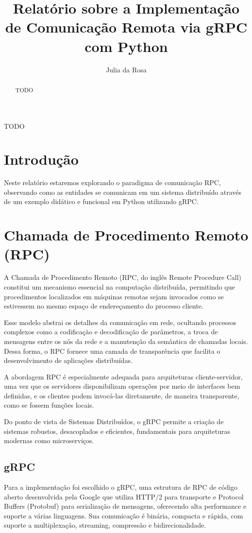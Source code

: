 \documentclass[12pt]{article}
\title{Relatório sobre a Implementação de Comunicação Remota via gRPC com Python}
\author{Julia da Rosa\inst{1}}
\begin{document}
 

\maketitle

\begin{abstract}
  TODO
\end{abstract}
     
\begin{resumo} 
  TODO
\end{resumo}

\section{Introdução}

Neste relatório estaremos explorando o paradigma de comunicação RPC, observando como as entidades se comunicam em um sistema distribuído através de um exemplo didático e funcional em Python utilizando gRPC.

\section{Chamada de Procedimento Remoto (RPC)}

A Chamada de Procedimento Remoto (RPC, do inglês Remote Procedure Call) constitui um mecanismo essencial na computação distribuída, permitindo que procedimentos localizados em máquinas remotas sejam invocados como se estivessem no mesmo espaço de endereçamento do processo cliente.

Esse modelo abstrai os detalhes da comunicação em rede, ocultando processos complexos como a codificação e decodificação de parâmetros, a troca de mensagens entre os nós da rede e a manutenção da semântica de chamadas locais. Dessa forma, o RPC fornece uma camada de transparência que facilita o desenvolvimento de aplicações distribuídas.

A abordagem RPC é especialmente adequada para arquiteturas cliente-servidor, uma vez que os servidores disponibilizam operações por meio de interfaces bem definidas, e os clientes podem invocá-las diretamente, de maneira transparente, como se fossem funções locais.

Do ponto de vista de Sistemas Distribuídos, o gRPC permite a criação de sistemas robustos, desacoplados e eficientes, fundamentais para arquiteturas modernas como microserviços.


\subsection{gRPC}
Para a implementação foi escolhido o gRPC, uma estrutura de RPC de código aberto desenvolvida pela Google que utiliza HTTP/2 para transporte e Protocol Buffers (Protobuf) para serialização de mensagens, oferecendo alta performance e suporte a várias linguagens. Sua comunicação é binária, compacta e rápida, com suporte a multiplexação, streaming, compressão e bidirecionalidade.
\end{document}
